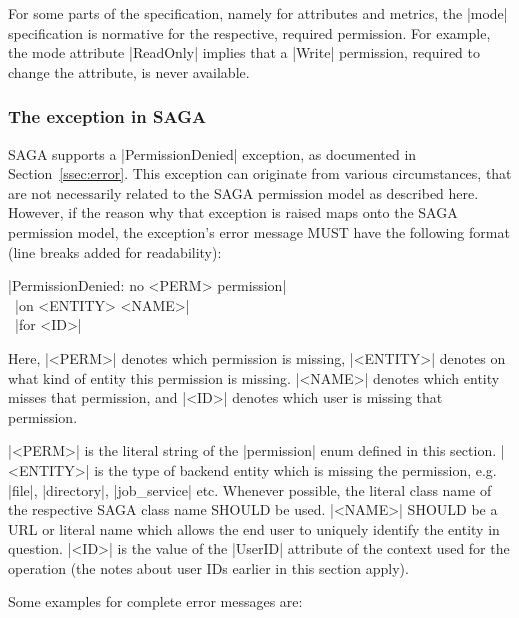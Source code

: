   For some parts of the specification, namely for attributes and
  metrics, the |mode| specification is normative for the
  respective, required permission.  For example, the mode
  attribute |ReadOnly| implies that a |Write| permission,
  required to change the attribute, is never available.
 
 
 \subsubsection*{The  exception in SAGA}
 
  SAGA supports a |PermissionDenied| exception, as documented in
  Section~\ref{ssec:error}.  This exception can originate from
  various circumstances, that are not necessarily related to
  the SAGA permission model as described here.  However, if
  the reason why that exception is raised maps onto the SAGA
  permission model, the exception's error message MUST have the
  following format (line breaks added for readability):
 
  \shift |PermissionDenied: no <PERM> permission|\\
  \shift\shift\shift\shift\, |on <ENTITY> <NAME>|\\
  \shift\shift\shift\shift\, |for <ID>|
 
  Here, |<PERM>| denotes which permission is missing, |<ENTITY>|
  denotes on what kind of entity this permission is missing.
  |<NAME>| denotes which entity misses that permission, and
  |<ID>| denotes which user is missing that permission.  
  
  |<PERM>| is the literal string of the |permission| enum
  defined in this section.  |<ENTITY>| is the type of backend
  entity which is missing the permission, e.g. |file|,
  |directory|, |job_service| etc.  Whenever possible, the
  literal class name of the respective SAGA class name SHOULD be
  used.  |<NAME>| SHOULD be a URL or literal name which allows
  the end user to uniquely identify the entity in question.
  |<ID>| is the value of the |UserID| attribute of the context
  used for the operation (the notes about user IDs earlier in
  this section apply).
 
  Some examples for complete error messages are:
 
